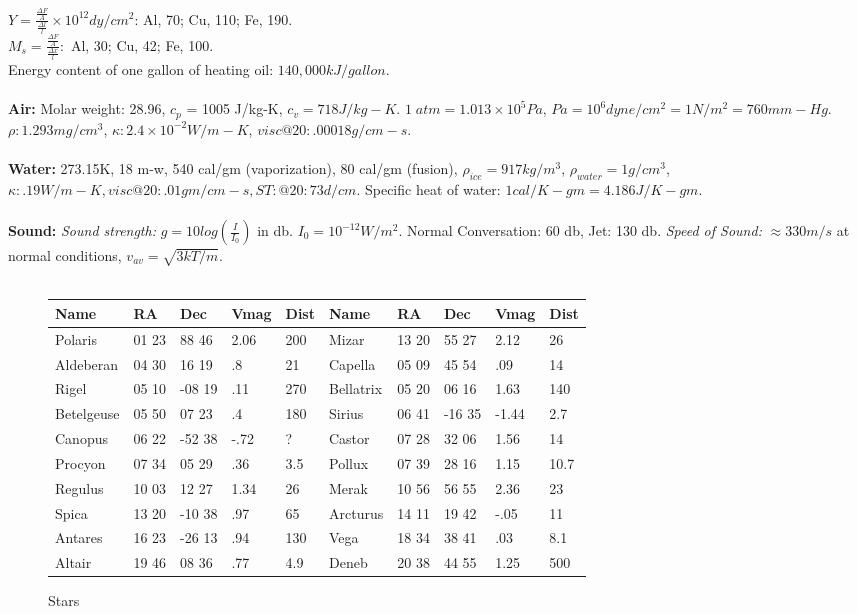 $Y= {\frac {\frac {\Delta F}{A}} {\frac {\Delta l}{l}}} \times
10^{12} dy/cm^{2}$: Al, 70; Cu, 110; Fe, 190.  \\
$M_{s} = {\frac {\frac {\Delta F} {A}} {\frac {\Delta x} {l}}}:$
Al, 30; Cu, 42; Fe, 100.\\
Energy content of one gallon of heating oil: $140,000 kJ/gallon$.
\\
\\
{\bf Air:} Molar weight: 28.96, $c_{p}$ = 1005 J/kg-K, $c_{v} = 718 J/kg-K$.
$1\; atm= 1.013 \times 10^{5} Pa$, $Pa= 10^{6} dyne/cm^{2}= 1N/m^2=760 mm-Hg$.
$\rho: 1.293 mg/cm^{3}$, $\kappa :  2.4 \times 10^{-2} W/m-K$, $visc@20: .00018 g/cm-s.$
\\
\\
{\bf Water:} 273.15K, 18 m-w, 540 cal/gm (vaporization), 80 cal/gm (fusion),
$\rho_{ice} = 917 kg / m^{3}$,
$\rho_{water} = 1 g / cm^{3}$,
$\kappa:  .19 W/m-K, visc@20: .01gm/cm-s, ST: @20: 73d/cm.$  Specific
heat of water: $1 cal/K-gm= 4.186 J/K-gm$.
\\
\\
{\bf Sound:}
\emph{Sound strength:} $g= 10 log({\frac {I} {I_0}})$ in db.  $I_0 = 10^{-12}
W/m^2$. Normal Conversation: 60 db, Jet: 130 db.
\emph{Speed of Sound:}
$\approx 330 m/s$ at normal conditions,
$v_{av} = {\sqrt { {3 k T } / m }}$.
\\
\\
\begin{figure} [h]
\begin{center}
\begin{tabular} {|lllll|lllll|}
\hline
{\bf Name} & {\bf RA} & {\bf Dec} & {\bf Vmag} & {\bf Dist} & {\bf Name} & {\bf RA} & {\bf Dec} & {\bf Vmag} & {\bf Dist} \\
\hline
Polaris & 01 23 & 88 46 & 2.06 & 200 & Mizar & 13 20 & 55 27 & 2.12 & 26 \\
\hline
Aldeberan & 04 30 & 16 19 & .8 & 21 & Capella & 05 09 & 45 54 & .09 & 14 \\
\hline
Rigel & 05 10 & -08 19 & .11 & 270 & Bellatrix & 05 20 & 06 16 & 1.63 & 140 \\
\hline
Betelgeuse & 05 50 & 07 23 & .4 & 180 & Sirius & 06 41 & -16 35 & -1.44 & 2.7 \\
\hline
Canopus & 06 22 & -52 38 & -.72 & ? & Castor & 07 28 & 32 06 & 1.56 & 14 \\
\hline
Procyon & 07 34 & 05 29 & .36 & 3.5 & Pollux & 07 39 & 28 16 & 1.15 & 10.7 \\
\hline
Regulus & 10 03 & 12 27 & 1.34 & 26 & Merak & 10 56 & 56 55 & 2.36 & 23 \\
\hline
Spica & 13 20 & -10 38 & .97 & 65 & Arcturus & 14 11 & 19 42 & -.05 & 11 \\
\hline
Antares & 16 23 & -26 13 & .94 & 130 & Vega & 18 34 & 38 41 & .03 & 8.1 \\
\hline
Altair & 19 46 & 08 36 & .77 & 4.9 & Deneb & 20 38 & 44 55 & 1.25 & 500\\
\hline
\end{tabular}
\end{center}
\caption{Stars}
\end{figure}
